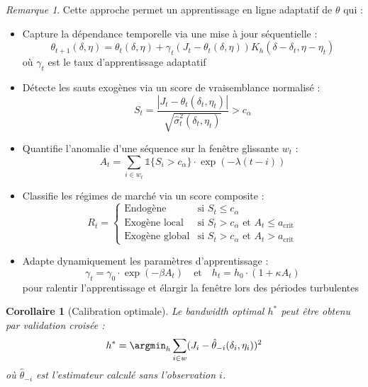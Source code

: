 \documentclass[12pt,a4paper]{article}
\newtheorem{corollary}[theorem]{Corollaire}
\theoremstyle{definition}
\theoremstyle{remark}
\newtheorem{remark}[theorem]{Remarque}
\begin{document}
\begin{remark}
Cette approche permet un apprentissage en ligne adaptatif de $\theta$ qui :
\begin{itemize}
    \item Capture la dépendance temporelle via une mise à jour séquentielle :
    \[
    \theta_{t+1}(\delta, \eta) = \theta_t(\delta, \eta) + \gamma_t(J_t - \theta_t(\delta, \eta))K_h(\delta - \delta_t, \eta - \eta_t)
    \]
    où $\gamma_t$ est le taux d'apprentissage adaptatif
    
    \item Détecte les sauts exogènes via un score de vraisemblance normalisé :
    \[
    S_t = \frac{|J_t - \theta_t(\delta_t, \eta_t)|}{\sqrt{\hat{\sigma}^2_t(\delta_t, \eta_t)}} > c_{\alpha}
    \]
    
    \item Quantifie l'anomalie d'une séquence sur la fenêtre glissante $w_t$ :
    \[
    A_t = \sum_{i \in w_t} \mathbb{1}\{S_i > c_{\alpha}\} \cdot \exp(-\lambda(t-i))
    \]
    
    \item Classifie les régimes de marché via un score composite :
    \[
    R_t = \begin{cases}
    \text{Endogène} & \text{si } S_t \leq c_{\alpha} \\
    \text{Exogène local} & \text{si } S_t > c_{\alpha} \text{ et } A_t \leq a_{\text{crit}} \\
    \text{Exogène global} & \text{si } S_t > c_{\alpha} \text{ et } A_t > a_{\text{crit}}
    \end{cases}
    \]
    
    \item Adapte dynamiquement les paramètres d'apprentissage :
    \[
    \gamma_t = \gamma_0 \cdot \exp(-\beta A_t) \quad \text{et} \quad h_t = h_0 \cdot (1 + \kappa A_t)
    \]
    pour ralentir l'apprentissage et élargir la fenêtre lors des périodes turbulentes
\end{itemize}
\end{remark}

\begin{corollary}[Calibration optimale]
Le bandwidth optimal $h^*$ peut être obtenu par validation croisée :
\[
h^* = \argmin_h \sum_{i \in w} (J_i - \hat{\theta}_{-i}(\delta_i, \eta_i))^2
\]
où $\hat{\theta}_{-i}$ est l'estimateur calculé sans l'observation $i$.
\end{corollary}
\end{document}
